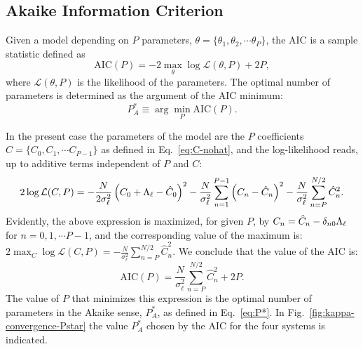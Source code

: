 \subsection{Akaike Information Criterion}  \label{sec:AIC}
Given a model depending on $P$ parameters, $\theta = \{\theta_{1}, \theta_{2}, \cdots \theta_{P}\}$, the AIC \cite{Claeskens2008,Akaike1974} is a sample statistic defined as
\begin{equation}
    \mathrm{AIC}(P) =-2\max_{\theta}\log\mathcal{L}(\theta,P)+2P,\label{eq:AIC}
\end{equation}
where $\mathcal{L}(\theta,P)$ is the likelihood of the parameters. The optimal number of parameters is determined as the argument of the AIC minimum:
\begin{equation}
    P_A^* \equiv \arg\min_P\mathrm{AIC}(P) . \label{eq:P*}
\end{equation}

In the present case the parameters of the model are the $P$ coefficients $C=\{C_{0},C_{1},\cdots C_{P-1}\}$ as defined in Eq.~\eqref{eq:C-nohat}, and the log-likelihood reads, up to additive terms independent of $P$ and $C$:
\begin{equation}
    2\log\mathcal{L}(C,P) = -\frac{N}{2\sigma_\ell^{2}}\left(C_{0}+{\mathrm\Lambda}_{\ell}-\hat{C}_{0}\right)^{2} -\frac{N}{\sigma_\ell^{2}}\sum_{n=1}^{P-1}\left(C_{n}-\hat{C}_{n}\right)^{2} -\frac{N}{\sigma_\ell^{2}}\sum_{n=P}^{N/2} \hat{C}_{n}^{2} .
\end{equation}
Evidently, the above expression is maximized, for given $P$, by $C_{n} = \hat{C}_{n} - \delta_{n0}{\mathrm\Lambda}_{\ell}$ for $n=0,1,\cdots P-1$, and the corresponding value of the maximum is: $2\max_C\log\mathcal{L}(C,P) = -\frac{N}{\sigma_\ell^{2}} \sum_{n=P}^{N/2} \hat{C}_{n}^{2}$.
We conclude that the value of the AIC is:
\begin{equation}
    \mathrm{AIC}(P) = \frac{N}{\sigma_\ell^{2}} \sum_{n=P}^{N/2} \hat{C}_{n}^{2} + 2P . \label{eq:AIC-P}
\end{equation}
The value of $P$ that minimizes this expression is the optimal number of parameters in the Akaike sense, $P_A^*$, as defined in Eq.~\eqref{eq:P*}.
In Fig.~\ref{fig:kappa-convergence-Pstar} the value $P_A^*$ chosen by the AIC for the four systems is indicated.


